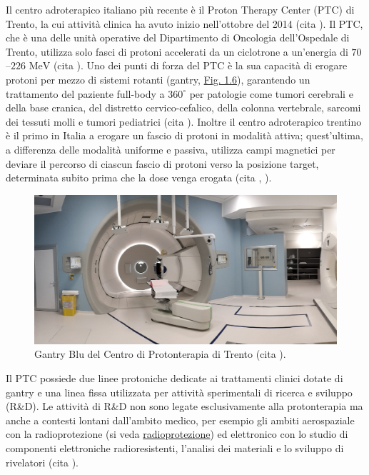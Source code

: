 \documentclass[12pt,a4paper,twoside]{report}
\begin{document}
	Il centro adroterapico italiano più recente è il Proton Therapy Center (PTC) di Trento, la cui attività clinica ha avuto inizio nell'ottobre del 2014 (cita
	). Il PTC, che è una delle unità operative del Dipartimento di Oncologia dell'Ospedale di Trento, utilizza solo fasci di protoni accelerati da un ciclotrone a un'energia di $70$--$226 \mbox{ MeV}$ (cita
	). Uno dei punti di forza del PTC è la sua capacità di erogare protoni per mezzo di sistemi rotanti (gantry, \hyperref[fig:gantry]{Fig. 1.6}), garantendo un trattamento del paziente full-body a $360^\circ$ per patologie come tumori cerebrali e della base cranica, del distretto cervico-cefalico, della colonna vertebrale, sarcomi dei tessuti molli e tumori pediatrici (cita
	). Inoltre il centro adroterapico trentino è il primo in Italia a erogare un fascio di protoni in modalità attiva; quest'ultima, a differenza delle modalità uniforme e passiva, utilizza campi magnetici per deviare il percorso di ciascun fascio di protoni verso la posizione target, determinata subito prima che la dose venga erogata (cita	%
	,
	).
	
	\begin{figure}[H]
		\centering
		\includegraphics[width=0.9\linewidth]{gantry.jpg}
		\caption{Gantry Blu del Centro di Protonterapia di Trento (cita
			).}
		\label{fig:gantry}
	\end{figure}
	
	Il PTC possiede due linee protoniche dedicate ai trattamenti clinici dotate di gantry e una linea fissa utilizzata per attività sperimentali di ricerca e sviluppo (R\&D). Le attività di R\&D non sono legate esclusivamente alla protonterapia ma anche a contesti lontani dall'ambito medico, per esempio gli ambiti aerospaziale con la radioprotezione (si veda \hyperref[label]{radioprotezione}) ed elettronico con lo studio di componenti elettroniche radioresistenti, l'analisi dei materiali e lo sviluppo di rivelatori (cita
	). 
	
\end{document}
